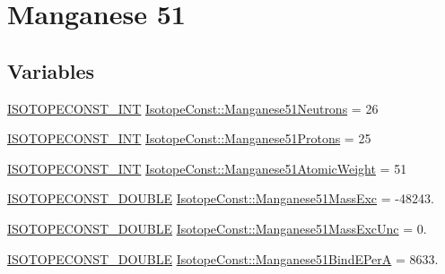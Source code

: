 \hypertarget{group___isotope_const-_manganese-_mn51}{}\section{Manganese 51}
\label{group___isotope_const-_manganese-_mn51}
\subsection*{Variables}
\begin{DoxyCompactItemize}
\item 
\mbox{\hyperlink{group___isotope_const-_macros_ga5f18360b3e99483a35c32d789e62621c}{I\+S\+O\+T\+O\+P\+E\+C\+O\+N\+S\+T\+\_\+\+I\+NT}} \mbox{\hyperlink{group___isotope_const-_manganese-_mn51_gae38b16f890425860be90b4a5c22bba32}{Isotope\+Const\+::\+Manganese51\+Neutrons}} = 26
\item 
\mbox{\hyperlink{group___isotope_const-_macros_ga5f18360b3e99483a35c32d789e62621c}{I\+S\+O\+T\+O\+P\+E\+C\+O\+N\+S\+T\+\_\+\+I\+NT}} \mbox{\hyperlink{group___isotope_const-_manganese-_mn51_ga743c6e7a55032f9bea08211001139ab3}{Isotope\+Const\+::\+Manganese51\+Protons}} = 25
\item 
\mbox{\hyperlink{group___isotope_const-_macros_ga5f18360b3e99483a35c32d789e62621c}{I\+S\+O\+T\+O\+P\+E\+C\+O\+N\+S\+T\+\_\+\+I\+NT}} \mbox{\hyperlink{group___isotope_const-_manganese-_mn51_gadb3220985fa9a116a96cba7005105b9a}{Isotope\+Const\+::\+Manganese51\+Atomic\+Weight}} = 51
\item 
\mbox{\hyperlink{group___isotope_const-_macros_ga8f45a7272ce02c0b4c65c44636ed719a}{I\+S\+O\+T\+O\+P\+E\+C\+O\+N\+S\+T\+\_\+\+D\+O\+U\+B\+LE}} \mbox{\hyperlink{group___isotope_const-_manganese-_mn51_ga4a930b5cb6e5b44091f55799706f837b}{Isotope\+Const\+::\+Manganese51\+Mass\+Exc}} = -\/48243.
\item 
\mbox{\hyperlink{group___isotope_const-_macros_ga8f45a7272ce02c0b4c65c44636ed719a}{I\+S\+O\+T\+O\+P\+E\+C\+O\+N\+S\+T\+\_\+\+D\+O\+U\+B\+LE}} \mbox{\hyperlink{group___isotope_const-_manganese-_mn51_ga470428973d3c4a485dc0f904225ce4e0}{Isotope\+Const\+::\+Manganese51\+Mass\+Exc\+Unc}} = 0.
\item 
\mbox{\hyperlink{group___isotope_const-_macros_ga8f45a7272ce02c0b4c65c44636ed719a}{I\+S\+O\+T\+O\+P\+E\+C\+O\+N\+S\+T\+\_\+\+D\+O\+U\+B\+LE}} \mbox{\hyperlink{group___isotope_const-_manganese-_mn51_ga2a2cadf754b6b2ec59f0d026ae78136d}{Isotope\+Const\+::\+Manganese51\+Bind\+E\+PerA}} = 8633.
\item 

\end{DoxyCompactItemize}
